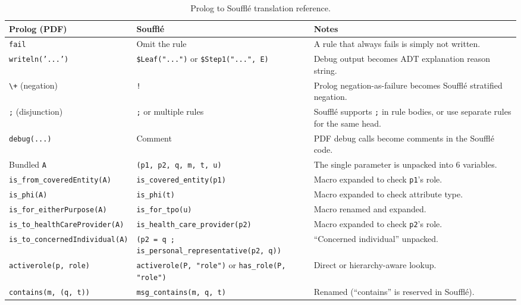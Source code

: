 \documentclass[11pt,letterpaper]{article}
\begin{document}
\begin{table}[H]
\centering
\begin{tabularx}{\textwidth}{llX}
\toprule
\textbf{Prolog (PDF)} & \textbf{Souffl\'{e}} & \textbf{Notes} \\
\midrule
\texttt{fail} & Omit the rule & A rule that always fails is simply not written. \\
\texttt{writeln('...')} & \texttt{\$Leaf("...")} or \texttt{\$Step1("...", E)} & Debug output becomes ADT explanation reason string. \\
\texttt{\textbackslash+} (negation) & \texttt{!} & Prolog negation-as-failure becomes Souffl\'{e} stratified negation. \\
\texttt{;} (disjunction) & \texttt{;} or multiple rules & Souffl\'{e} supports \texttt{;} in rule bodies, or use separate rules for the same head. \\
\texttt{debug(...)} & Comment & PDF debug calls become comments in the Souffl\'{e} code. \\
Bundled \texttt{A} & \texttt{(p1, p2, q, m, t, u)} & The single parameter is unpacked into 6 variables. \\
\texttt{is\_from\_coveredEntity(A)} & \texttt{is\_covered\_entity(p1)} & Macro expanded to check \texttt{p1}'s role. \\
\texttt{is\_phi(A)} & \texttt{is\_phi(t)} & Macro expanded to check attribute type. \\
\texttt{is\_for\_eitherPurpose(A)} & \texttt{is\_for\_tpo(u)} & Macro renamed and expanded. \\
\texttt{is\_to\_healthCareProvider(A)} & \texttt{is\_health\_care\_provider(p2)} & Macro expanded to check \texttt{p2}'s role. \\
\texttt{is\_to\_concernedIndividual(A)} & \texttt{(p2 = q ; is\_personal\_representative(p2, q))} & ``Concerned individual'' unpacked. \\
\texttt{activerole(p, role)} & \texttt{activerole(P, "role")} or \texttt{has\_role(P, "role")} & Direct or hierarchy-aware lookup. \\
\texttt{contains(m, (q, t))} & \texttt{msg\_contains(m, q, t)} & Renamed (``contains'' is reserved in Souffl\'{e}). \\
\bottomrule
\end{tabularx}
\caption{Prolog to Souffl\'{e} translation reference.}
\label{tab:prolog-translation}
\end{table}


\end{document}
